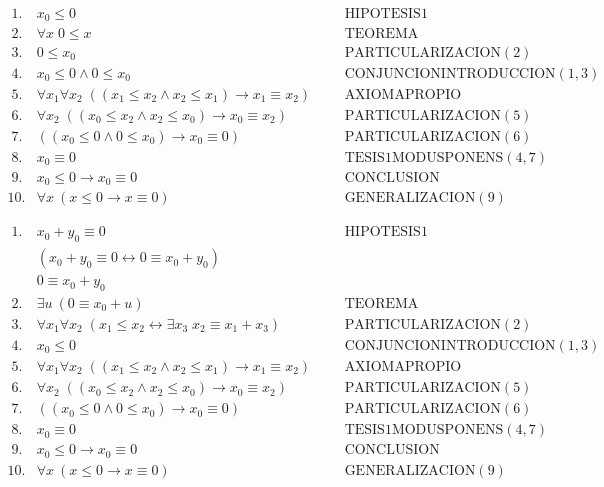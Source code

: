\(\displaystyle \begin{array}{lllll} \;1. & x_{0}\leq 0 & & & \text{HIPOTESIS}1 \\ \;2. & \forall x\;0\leq x & & & \text{TEOREMA} \\ \;3. & 0\leq x_{0} & & & \text{PARTICULARIZACION}(2) \\ \;4. & x_{0}\leq 0\wedge 0\leq x_{0} & & & \text{CONJUNCIONINTRODUCCION} (1,3) \\ \;5. & \forall x_{1}\forall x_{2}\;((x_{1}\leq x_{2}\wedge x_{2}\leq x_{1})\rightarrow x_{1}\equiv x_{2}) & & & \text{AXIOMAPROPIO} \\ \;6. & \forall x_{2}\;((x_{0}\leq x_{2}\wedge x_{2}\leq x_{0})\rightarrow x_{0}\equiv x_{2}) & & & \text{PARTICULARIZACION}(5) \\ \;7. & ((x_{0}\leq 0\wedge 0\leq x_{0})\rightarrow x_{0}\equiv 0) & & & \text{PARTICULARIZACION}(6) \\ \;8. & x_{0}\equiv 0 & & & \text{TESIS}1\text{MODUSPONENS}(4,7) \\ \;9. & x_{0}\leq 0\rightarrow x_{0}\equiv 0 & & & \text{CONCLUSION} \\ 10. & \forall x\ (x\leq 0\rightarrow x\equiv 0) & & & \text{GENERALIZACION} (9) \end{array} \)

\(\displaystyle \begin{array}{lllll} \;1. & x_{0}+y_{0}\equiv 0 & & & \text{HIPOTESIS}1 \\ & (x_{0}+y_{0}\equiv 0\leftrightarrow 0\equiv x_{0}+y_{0}) & & & \\ & 0\equiv x_{0}+y_{0} & & & \\ \;2. & \exists u\ (0\equiv x_{0}+u) & & & \text{TEOREMA} \\ \;3. & \forall x_{1}\forall x_{2}\;(x_{1}\leq x_{2}\leftrightarrow \exists x_{3}\;x_{2}\equiv x_{1}+x_{3}) & & & \text{PARTICULARIZACION}(2) \\ \;4. & x_{0}\leq 0 & & & \text{CONJUNCIONINTRODUCCION}(1,3) \\ \;5. & \forall x_{1}\forall x_{2}\;((x_{1}\leq x_{2}\wedge x_{2}\leq x_{1})\rightarrow x_{1}\equiv x_{2}) & & & \text{AXIOMAPROPIO} \\ \;6. & \forall x_{2}\;((x_{0}\leq x_{2}\wedge x_{2}\leq x_{0})\rightarrow x_{0}\equiv x_{2}) & & & \text{PARTICULARIZACION}(5) \\ \;7. & ((x_{0}\leq 0\wedge 0\leq x_{0})\rightarrow x_{0}\equiv 0) & & & \text{PARTICULARIZACION}(6) \\ \;8. & x_{0}\equiv 0 & & & \text{TESIS}1\text{MODUSPONENS}(4,7) \\ \;9. & x_{0}\leq 0\rightarrow x_{0}\equiv 0 & & & \text{CONCLUSION} \\ 10. & \forall x\ (x\leq 0\rightarrow x\equiv 0) & & & \text{GENERALIZACION} (9) \end{array} \)


